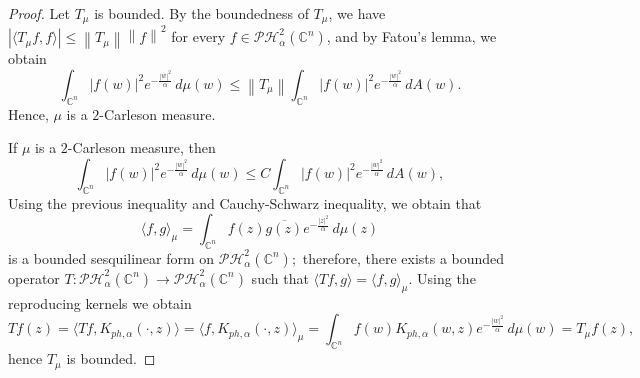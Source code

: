 \documentclass[10pt,leqno]{amsart}
\theoremstyle{remark}
\numberwithin{equation}{section}
\newcommand{\hph}{\mathcal{PH}_\alpha^2(\mathbb{C}^n)}%
\newcommand{\Kph}{K_{ph,\alpha}}%
\newcommand{\kph}{k_{ph,\alpha}}%
\begin{document}
\begin{proof}
	Let $T_\mu$ is bounded. By the boundedness of $T_\mu$, we have $|\langle T_\mu f,f \rangle|\leq \left\lVert T_\mu \right\rVert \left\lVert f \right\rVert ^2$ for every $f \in \hph$, and by Fatou's lemma, we obtain
	\[
		\int_{\mathbb{C}^{n}}^{}|f(w)|^2 e^{-\frac{|w|^2}{\alpha}}\, d\mu(w)\leq \left\lVert T_\mu \right\rVert \int_{\mathbb{C}^{n}}^{}\left| f(w) \right| ^2e^{-\frac{|w|^2}{\alpha}}\, dA(w).
	\]
	Hence, $\mu$ is a $2$-Carleson measure.

	If $\mu$ is a $2$-Carleson measure, then
	\[
		\int_{\mathbb{C}^{n}}^{}|f(w)|^2 e^{-\frac{|w|^2}{\alpha}}\, d\mu(w) \leq  C \int_{\mathbb{C}^{n}}^{}\left| f(w) \right| ^2e^{-\frac{|w|^2}{\alpha}}\, dA(w),
	\]
	Using the previous inequality and Cauchy-Schwarz inequality, we obtain that
	\[
		\langle f,g \rangle_{\mu} = \int_{\mathbb{C}^{n}}^{}f(z)\overline{g(z)}e^{-\frac{|z|^2}{\alpha}}\, d\mu(z)
	\]
	is a bounded sesquilinear form on $\hph;$ therefore, there exists a bounded operator $T:\hph \to \hph$ such that $\langle Tf,g \rangle=\langle f,g \rangle_\mu.$ Using the reproducing kernels we obtain
	\[
		Tf(z)=\langle Tf,\Kph(\cdot,z) \rangle =\langle f,\Kph(\cdot,z) \rangle_\mu = \int_{\mathbb{C}^{n}}^{}f(w)\Kph(w,z)e^{-\frac{|w|^2}{\alpha}}\, d\mu(w) = T_\mu f(z),
	\]
	hence $T_\mu$ is bounded.
\end{proof}
\end{document}
